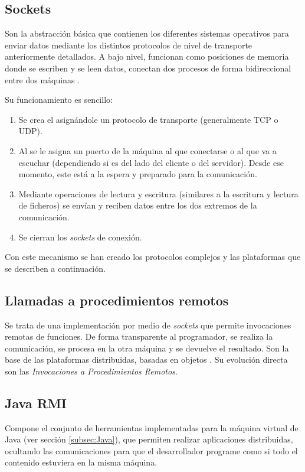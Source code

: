 \subsection{Sockets}
Son la abstracción básica que contienen los diferentes sistemas 
operativos para enviar datos mediante los distintos protocolos de 
nivel de transporte anteriormente detallados. A bajo nivel, funcionan 
como posiciones de memoria donde se escriben y se leen datos, conectan 
dos procesos de forma bidireccional entre dos máquinas 
\cite{SistemasOperativos}.

Su funcionamiento es sencillo:

\begin{enumerate}
	\item Se crea el \socket asignándole un protocolo de transporte 
	(generalmente TCP o UDP).
	\item Al \socket se le asigna un puerto de la máquina al que 
	conectarse o al que va a escuchar (dependiendo si es del lado del 
	cliente o del servidor). Desde ese momento, este está a la espera 
	y preparado para la comunicación.
	\item Mediante operaciones de lectura y escritura (similares a la 
	escritura y lectura de ficheros) se envían y reciben datos entre 
	los dos extremos de la comunicación.
	\item Se cierran los \emph{sockets} de conexión. 
\end{enumerate}

Con este mecanismo se han creado los protocolos complejos y las 
plataformas que se describen a continuación.

\subsection{Llamadas a procedimientos remotos}
Se trata de una implementación por medio de \emph{sockets} que permite 
invocaciones remotas de funciones. De forma transparente al 
programador, se realiza la comunicación, se procesa en la otra 
máquina y se devuelve el resultado. Son la base de las plataformas 
distribuidas, basadas en objetos \cite{SistemasOperativos}. Su 
evolución directa son las \emph{Invocaciones a Procedimientos Remotos}.

\subsection{Java RMI}
Compone el conjunto de herramientas implementadas para la máquina 
virtual  de Java (ver sección 
\ref{subsec:Java}), que permiten realizar aplicaciones distribuidas, 
ocultando las comunicaciones para que el desarrollador programe como si 
todo el contenido estuviera en la misma máquina.

